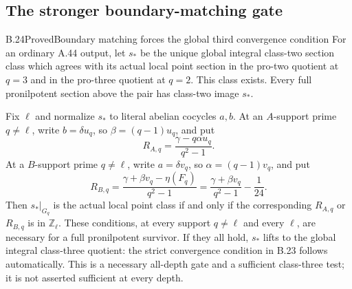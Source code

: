 \subsection{The stronger boundary-matching gate}

\begin{result}{B.24}{Proved}{Boundary matching forces the global third convergence condition}
\label{coh:boundarygate}
For an ordinary A.44 output, let $s_*$ be the unique global integral
class-two section class which agrees with its actual local point
section in the pro-two quotient at $q=3$ and in the pro-three quotient
at $q=2$. This class exists. Every full pronilpotent section above
the pair has class-two image $s_*$.

Fix $\ell$ and normalize $s_*$ to literal abelian cocycles $a,b$.
At an $A$-support prime $q\ne\ell$, write
$b=\delta u_q$, so $\beta=(q-1)u_q$, and put
\[
 R_{A,q}=\frac{\gamma-q\alpha u_q}{q^2-1}.
\]
At a $B$-support prime $q\ne\ell$, write
$a=\delta v_q$, so $\alpha=(q-1)v_q$, and put
\[
 R_{B,q}=\frac{\gamma+\beta v_q-\eta(F_q)}{q^2-1}
       =\frac{\gamma+\beta v_q}{q^2-1}-\frac1{24}.
\]
Then $s_*|_{G_q}$ is the actual local point class if and only if
the corresponding $R_{A,q}$ or $R_{B,q}$ is in $\mathbb Z_\ell$.
These conditions, at every support $q\ne\ell$ and every $\ell$,
are necessary for a full pronilpotent survivor. If they all hold,
$s_*$ lifts to the global integral class-three quotient: the strict
convergence condition in B.23 follows automatically. This is a
necessary all-depth gate and a sufficient class-three test; it is
not asserted sufficient at every depth.
\end{result}
